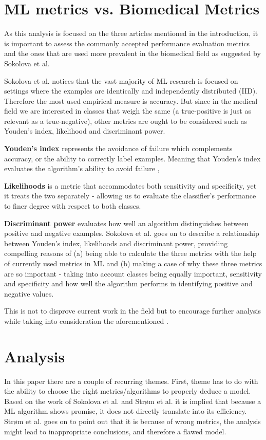 \documentclass[fullpage]{article}
\begin{document}
\begin{multicols}{2}
\section{ML metrics vs. Biomedical Metrics}
As this analysis is focused on the three articles mentioned in the introduction, it is important to assess the commonly accepted performance evaluation metrics and the ones that are used more prevalent in the biomedical field as suggested by Sokolova et al. \cite{Sokolova2006}

Sokolova et al. notices that the vast majority of ML research is focused on settings where the examples are identically and independently distributed (IID). Therefore the most used empirical measure is accuracy. But since in the medical field we are interested in classes that weigh the same (a true-positive is just as relevant as a true-negative), other metrics are ought to be considered such as Youden’s index, likelihood and discriminant power.

\textbf{Youden's index} represents the avoidance of failure which complements accuracy, or the ability to correctly label examples. Meaning that Youden's index evaluates the algorithm's ability to avoid failure \cite{Sokolova2006}, \cite{Youden}

\textbf{Likelihoods} is a metric that accommodates both sensitivity and specificity, yet it treats the two separately - allowing us to evaluate the classifier's performance to finer degree with respect to both classes.

\textbf{Discriminant power} evaluates how well an algorithm distinguishes between positive and negative examples. Sokolova et al. \cite{Sokolova2006} goes on to describe a relationship between Youden's index, likelihoods and discriminant power, providing compelling reasons of (a) being able to calculate the three metrics with the help of currently used metrics in ML and (b) making a case of why these three metrics are so important - taking into account classes being equally important, sensitivity and specificity and how well the algorithm performs in identifying positive and negative values.

This is not to disprove current work in the field but to encourage further analysis while taking into consideration the aforementioned \cite{Strom2018}.
\section{Analysis}
In this paper there are a couple of recurring themes. First, theme has to do with the ability to choose the right metrics/algorithms to properly deduce a model. Based on the work of Sokolova et al. \cite{Sokolova2006} and Strøm et al. \cite{Strom2018} it is implied that because a ML algorithm shows promise, it does not directly translate into its efficiency. Strøm et al. \cite{Strom2018} goes on to point out that it is because of wrong metrics, the analysis might lead to inappropriate conclusions, and therefore a flawed model.


\end{multicols}
\end{document}
